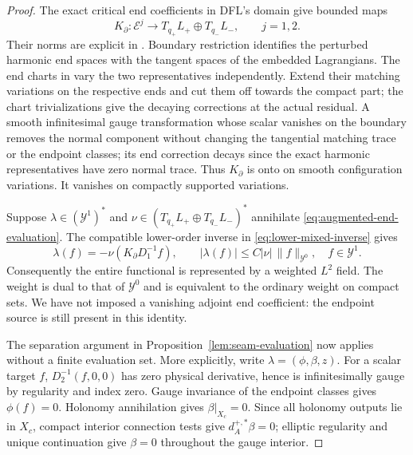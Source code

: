 \documentclass[11pt]{amsart}
\theoremstyle{definition}
\theoremstyle{remark}
\theoremstyle{plain}
\begin{document}
\begin{proof}
The exact critical end coefficients in DFL's domain give bounded maps
\[
 K_\partial:\mathcal E^j\longrightarrow
             T_{q_+}L_+\oplus T_{q_-}L_-,
 \qquad j=1,2.
\]
Their norms are explicit in \cite[equation~(4.5)]{DaeFukLip21a}.
Boundary restriction identifies the perturbed harmonic end spaces
with the tangent spaces of the embedded Lagrangians. The end charts
in \cite[Section~4.1]{DaeFukLip21a} vary the two representatives
independently. Extend their matching variations on the respective
ends and cut them off towards the compact part; the chart
trivializations give the decaying corrections at the actual
residual. A smooth infinitesimal gauge transformation whose scalar
vanishes on the boundary removes the normal component without changing
the tangential matching trace or the endpoint classes; its end correction
decays since the exact harmonic representatives have zero normal trace.
Thus $K_\partial$ is onto on smooth
configuration variations. It vanishes on compactly supported variations.

Suppose $\lambda\in(\mathcal Y^1)^*$ and
$\nu\in(T_{q_+}L_+\oplus T_{q_-}L_-)^*$ annihilate
\eqref{eq:augmented-end-evaluation}. The compatible lower-order
inverse in \eqref{eq:lower-mixed-inverse} gives
\begin{equation}\label{eq:end-adjoint-ltwo}
 \lambda(f)=-\nu(K_\partial D_1^{-1}f),\qquad
 |\lambda(f)|\leq C|\nu|\,\|f\|_{\mathcal Y^0},
 \quad f\in\mathcal Y^1.
\end{equation}
Consequently the entire functional is represented by a weighted
$L^2$ field. The weight is dual to that of $\mathcal Y^0$ and
is equivalent to the ordinary weight on compact sets. We have
not imposed a vanishing adjoint end coefficient: the endpoint
source is still present in this identity.

The separation argument in Proposition~\ref{lem:seam-evaluation}
now applies without a finite evaluation set. More explicitly,
write $\lambda=(\phi,\beta,z)$. For a scalar target $f$,
$D_2^{-1}(f,0,0)$ has zero physical derivative, hence is
infinitesimally gauge by regularity and index zero.
Gauge invariance of the endpoint classes gives $\phi(f)=0$.
Holonomy annihilation gives $\beta|_{X_c}=0$. Since all holonomy
outputs lie in $X_c$, compact interior connection tests give
$d_A^{+,*}\beta=0$; elliptic regularity and unique continuation
give $\beta=0$ throughout the gauge interior.


\end{proof}
\end{document}
